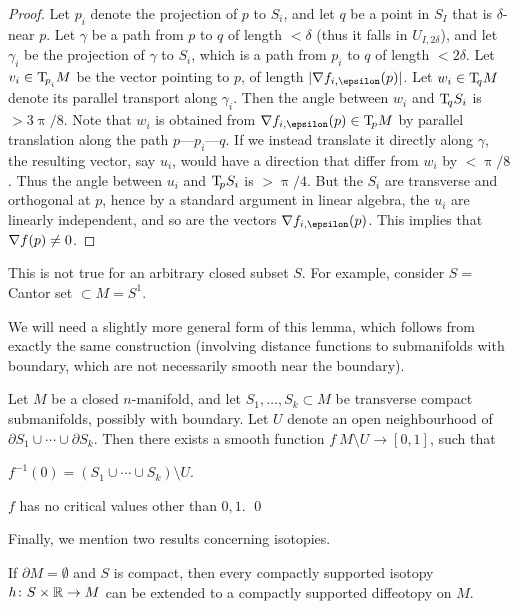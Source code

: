 \begin{proof}
Let $p_i$ denote the projection of $p$ to $S_i$,
and let $q$ be a point in $S_I$ that is $\delta$-near $p$.
Let $\gamma$ be a path from $p$ to $q$ of length $<\delta$ (thus it falls in $U_{I,2\delta}$),
and let $\gamma_i$ be the projection of $\gamma$ to $S_i$,
which is a path from $p_i$ to $q$ of length $<2\delta$.
Let $v_i\in\mathrm{T}\!_{p_i^{}}M$ be the vector pointing to $p$, of length $|\grad f_{i,\epsilon}(p)|$.
Let $w_i\in\mathrm{T}\!_qM$ denote its parallel transport along $\gamma_i$.
Then the angle between $w_i$ and $\mathrm{T}\!_qS_i$ is $>3\uppi/8$.
Note that $w_i$ is obtained from $\grad f_{i,\epsilon}(p)\in\T_pM$
by parallel translation along the path $p$---$p_i$---$q$.
If we instead translate it directly along $\gamma$,
the resulting vector, say $u_i$,
would have a direction that differ from $w_i$ by $<\uppi/8$.
Thus the angle between $u_i$ and $\mathrm{T}\!_pS_i$ is $>\uppi/4$.
But the $S_i$ are transverse and orthogonal at $p$,
hence by a standard argument in linear algebra, the $u_i$ are linearly independent,
and so are the vectors $\grad f_{i,\epsilon}(p)$.
This implies that $\nabla f(p)\neq0$. 
\end{proof}

\begin{remark}
This is not true for an arbitrary closed subset $S$.
For example, consider $S=$ Cantor set $\subset M=S^1$. \varqed
\end{remark}

We will need a slightly more general form of this lemma,
which follows from exactly the same construction
(involving distance functions to submanifolds with boundary,
which are not necessarily smooth near the boundary).

\begin{corollary}\label{cor:function}
Let $M$ be a closed $n$-manifold,
and let $S_1,\dotsc,S_k\subset M$ be transverse compact submanifolds,
possibly with boundary.
Let $U$ denote an open neighbourhood of $\partial S_1\cup\cdots\cup\partial S_k$.
Then there exists a smooth function $f\:M\setminus U\to[0,1]$, such that
\begin{enum}
\item $f^{-1}(0)=(S_1\cup\cdots\cup S_k)\setminus U$.
\item $f$ has no critical values other than $0,1$. \qed
\end{enum}
\end{corollary}

Finally, we mention two results concerning isotopies.

\begin{lemma}\label{cor:isotopy-ext}
If $\partial M=\emptyset$ and $S$ is compact,
then every compactly supported isotopy $h\colon S\times\mathbb{R}\to M$
can be extended to a compactly supported diffeotopy on $M$.
\end{lemma}

